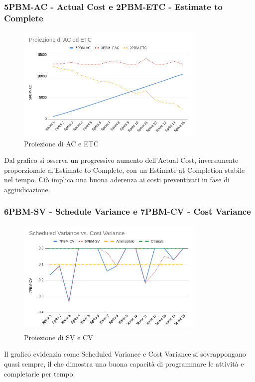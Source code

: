 \documentclass{article}
\begin{document}
        \subsubsection{5PBM-AC - Actual Cost e 2PBM-ETC - Estimate to Complete}
        \begin{figure}[H]
            \centering
            \includegraphics[width=0.8\textwidth]{../../img/pdq_charts/chart2-proiezioneACETC.png}
            \caption{Proiezione di AC e ETC}
        \end{figure}
        Dal grafico si osserva un progressivo aumento dell'Actual Cost, inversamente proporzionale al'Estimate to Complete, con un Estimate at Completion stabile nel tempo. Ciò implica una buona aderenza ai costi preventivati in fase di aggiudicazione.

        \subsubsection{6PBM-SV - Schedule Variance e 7PBM-CV - Cost Variance}
        \begin{figure}[H]
            \centering
            \includegraphics[width=0.8\textwidth]{../../img/pdq_charts/chart3-proiezioneSVCV.png}
            \caption{Proiezione di SV e CV}
        \end{figure}
        Il grafico evidenzia come Scheduled Variance e Cost Variance si sovrappongano quasi sempre, il che dimostra una buona capacità di programmare le attività e completarle per tempo.
\end{document}
